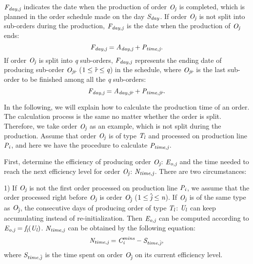 \documentclass[journal]{IEEEtran}
\theoremstyle{definition}
\begin{document}
$\emph{F}_\emph{day,j}$ indicates the date when the production of order $\emph{O}_\emph{j}$ is completed, which is planned in the order schedule made on the day $\emph{S}_\emph{day}$. If order $\emph{O}_\emph{j}$ is not split into sub-orders during the production, $\emph{F}_\emph{day,j}$ is the date when the production of $\emph{O}_\emph{j}$ ends:
\begin{equation}
\emph{F}_\emph{day,j}=\emph{A}_\emph{day,j}+\emph{P}_\emph{time,j}.
\label{eqfd1}
\end{equation}
If order $\emph{O}_\emph{j}$ is split into \emph{q} sub-orders, $\emph{F}_\emph{day,j}$ represents the ending date of producing sub-order $\emph{O}_{\emph{j}\check{\emph{r}}}$ ($1\leq\check{\emph{r}}\leq\emph{q}$) in the schedule, where $\emph{O}_{\emph{j}\check{\emph{r}}}$ is the last sub-order to be finished among all the \emph{q} sub-orders:
\begin{equation}
\emph{F}_\emph{day,j}=\emph{A}_{\emph{day,j}\check{\emph{r}}}+\emph{P}_{\emph{time,j}\check{\emph{r}}}.
\label{eqfd2}
\end{equation}

In the following, we will explain how to calculate the production time of an order. The calculation process is the same no matter whether the order is split. Therefore, we take order $\emph{O}_\emph{j}$ as an example, which is not split during the production. Assume that order $\emph{O}_\emph{j}$ is of type $\emph{T}_\emph{l}$ and processed on production line $\emph{P}_\emph{i}$, and here we have the procedure to calculate $\emph{P}_\emph{time,j}$.

First, determine the efficiency of producing order $\emph{O}_\emph{j}$: $\emph{E}_\emph{o,j}$ and the time needed to reach the next efficiency level for order $\emph{O}_\emph{j}$: $\emph{N}_\emph{time,j}$.
There are two circumstances:

1) If $\emph{O}_\emph{j}$ is not the first order processed on production line $\emph{P}_\emph{i}$, we assume that the order processed right before $\emph{O}_\emph{j}$ is order $\emph{O}_{\hat{\emph{j}}}$ ($1\leq\hat{\emph{j}}\leq\emph{n}$). If $\emph{O}_\emph{j}$ is of the same type as $\emph{O}_{\hat{\emph{j}}}$, the consecutive days of producing order of type $\emph{T}_\emph{l}$: $\emph{U}_\emph{l}$ can keep accumulating instead of re-initialization. Then $\emph{E}_\emph{o,j}$ can be computed according to $\emph{E}_\emph{o,j}=\emph{f}_\emph{l}(\emph{U}_\emph{l})$. $\emph{N}_\emph{time,j}$ can be obtained by the following equation:
\begin{equation}
\emph{N}_\emph{time,j}=\emph{C}^\emph{mins}_\emph{i}-\emph{S}_{\emph{time,}\hat{\emph{j}}},
\label{eqtn}
\end{equation}
where $\emph{S}_{\emph{time,}\hat{\emph{j}}}$ is the time spent on order $\emph{O}_{\hat{\emph{j}}}$ on its current efficiency level.
\end{document}
